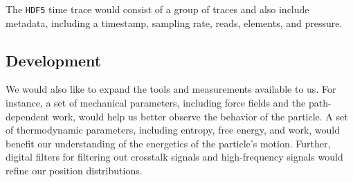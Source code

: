 \documentclass[a4paper,11pt,fleqn,english]{amsart}
\begin{document}
The \texttt{HDF5} time trace would consist of a group of traces and also include metadata, including a timestamp, sampling rate, reads, elements, and pressure.

\subsection{Development} We would also like to expand the tools and measurements available to us. For instance, a set of mechanical parameters, including force fields and the path-dependent work, would help us better observe the behavior of the particle. A set of thermodynamic parameters, including entropy, free energy, and work, would benefit our understanding of the energetics of the particle's motion. Further, digital filters for filtering out crosstalk signals and high-frequency signals would refine our position distributions.
\end{document}
